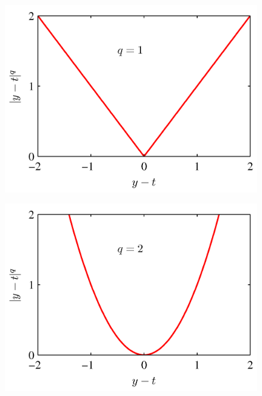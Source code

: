 \documentclass[b5paper]{book}
\numberwithin{equation}{chapter}
\begin{document}
{\begin{figure}[ht]
\begin{minipage}[t]{0.5\linewidth}
		\label{fig:1-29a}
		\end{minipage}
		\begin{minipage}[t]{0.5\linewidth}
		\includegraphics[scale=0.8]{Images/1-29b.png}
		\label{fig:1-29b}\\
		\end{minipage}
		\begin{minipage}[t]{0.5\linewidth}
		\includegraphics[scale=0.8]{Images/1-29c.png}
		\label{fig:1-29c}
		\end{minipage}
		\begin{minipage}[t]{0.5\linewidth}

\end{minipage}
\end{figure}}
\end{document}
